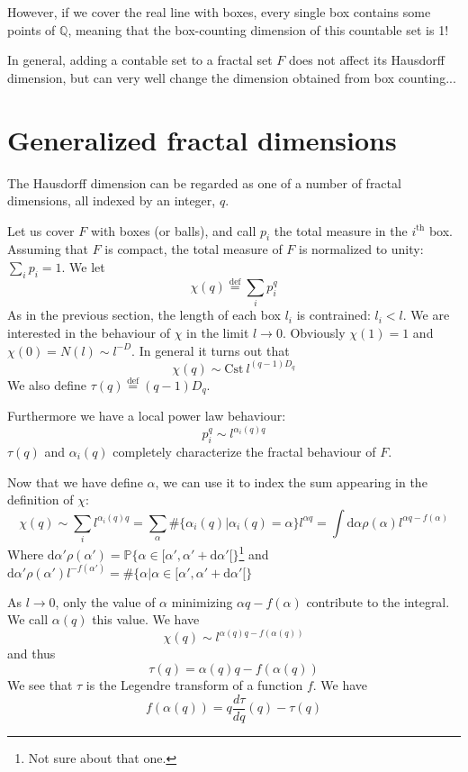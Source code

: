 \documentclass[11pt]{article}
\newcommand{\define}{\ensuremath{ \overset{\text{def}}{=} }}
\renewcommand{\d}[1]{\mathrm{d}#1}
\begin{document}
However, if we cover the real line with boxes, every single box contains some points of $\mathbb{Q}$, meaning that the box-counting dimension of this countable set is 1!

In general, adding a contable set to a fractal set $F$ does not affect its Hausdorff dimension, but can very well change the dimension obtained from box counting...

\section{Generalized fractal dimensions}
The Hausdorff dimension can be regarded as one of a number of fractal dimensions, all indexed by an integer, $q$.

Let us cover $F$ with boxes (or balls), and call $p_i$ the total measure in the $i^{\text{th}}$ box. Assuming that $F$ is compact, the total measure of $F$ is normalized to unity: $\sum_i p_i = 1$.
We let
\begin{equation}
	\chi(q) \define \sum_i p_i^q
\end{equation}
As in the previous section, the length of each box $l_i$ is contrained: $l_i < l$. We are interested in the behaviour of $\chi$ in the limit $l \rightarrow 0$.
Obviously $\chi(1) = 1$ and $\chi(0) = N(l) \sim l^{-D}$. In general it turns out that
\begin{equation}
\boxed{
	\chi(q) \sim \text{Cst}~l^{(q-1)D_q}
}
\end{equation}
We also define $\tau(q) \define (q-1) D_q$.

Furthermore we have a local power law behaviour:
\begin{equation}
\boxed{
	p_i^q \sim l^{\alpha_i(q) q}
}
\end{equation}
$\tau(q)$ and $\alpha_i(q)$ completely characterize the fractal behaviour of $F$.

Now that we have define $\alpha$, we can use it to index the sum appearing in the definition of $\chi$:
\begin{equation}
	\chi(q) \sim \sum_i l^{\alpha_i(q)q} = \sum_\alpha \# \{ \alpha_i(q) | \alpha_i(q) = \alpha\} l^{\alpha q} = \int \d{\alpha} \rho(\alpha) l^{\alpha q - f(\alpha)}
\end{equation}
Where $\d{\alpha'}\rho(\alpha') = \mathbb{P}\{ \alpha \in [\alpha', \alpha' + \d{\alpha'}[ \}$\footnote{Not sure about that one.} and  $\d{\alpha'}\rho(\alpha')l^{-f(\alpha')} = \#\{ \alpha | \alpha \in [\alpha', \alpha' + \d{\alpha'}[  \}$

As $l \rightarrow 0$, only the value of $\alpha$ minimizing $\alpha q - f(\alpha)$ contribute to the integral. We call $\alpha(q)$ this value. We have
\begin{equation}
	\chi(q) \sim l^{\alpha(q) q - f(\alpha(q))}
\end{equation}
and thus
\begin{equation}
\boxed{
	\tau(q) = \alpha(q) q - f(\alpha(q))
}
\end{equation}
We see that $\tau$ is the Legendre transform of a function $f$. We have
\begin{equation}
\boxed{
	f(\alpha(q)) = q \frac{d \tau}{d q}(q) - \tau(q)
}
\end{equation}
\end{document}
